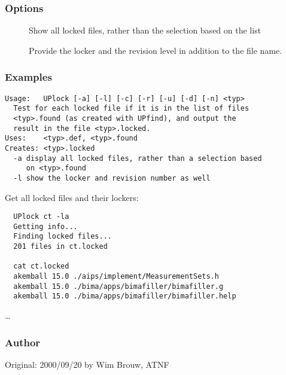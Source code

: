 \subsubsection*{Options}

\begin{description}
\item[]
    Show all locked files, rather than the selection based on the
     list
\item[]
    Provide the locker and the revision level in addition to the file name.
\end{description}

\subsubsection*{Examples}

\begin{verbatim}
Usage:   UPlock [-a] [-l] [-c] [-r] [-u] [-d] [-n] <typ>
  Test for each locked file if it is in the list of files
  <typ>.found (as created with UPfind), and output the 
  result in the file <typ>.locked.
Uses:    <typ>.def, <typ>.found
Creates: <typ>.locked
  -a display all locked files, rather than a selection based
     on <typ>.found
  -l show the locker and revision number as well
\end{verbatim}

\noindent
Get all locked files and their lockers:

\begin{verbatim}
  UPlock ct -la
  Getting info...
  Finding locked files...
  201 files in ct.locked

  cat ct.locked
  akemball 15.0 ./aips/implement/MeasurementSets.h
  akemball 15.0 ./bima/apps/bimafiller/bimafiller.g
  akemball 15.0 ./bima/apps/bimafiller/bimafiller.help
\end{verbatim}
\ldots

\subsubsection*{Author}

Original: 2000/09/20 by Wim Brouw, ATNF


\newpage

\subsection{}
\label{UPchange}


